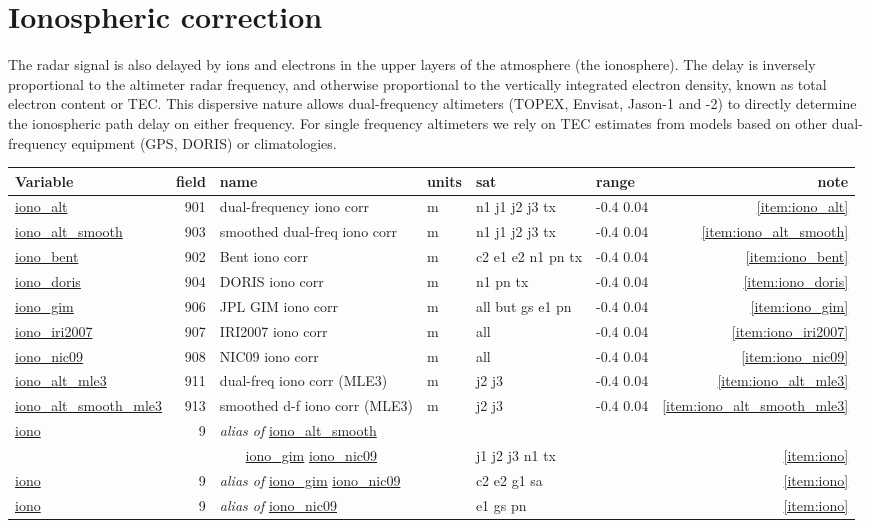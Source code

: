 \documentclass[a4paper,11pt,openany,natbib,nomargin]{thesis}
\makeatletter
\newcommand\var[1]{\url{#1}\index{variables!#1@\protect\url{#1}}}
\newcommand\alias[1]{\emph{alias of} \var{#1}}
\newenvironment{vartable}{
\begin{table}[ht]
\small
\begin{tabular}{lrllllr}
\hline
Variable & field & name & units & sat & range & note \\
\hline
}{
\hline
\end{tabular}
\end{table}
}
\makeatother
\begin{document}
\section{Ionospheric correction}
The radar signal is also delayed by ions and electrons in the upper layers of the atmosphere (the ionosphere). The delay is inversely proportional to the altimeter radar frequency, and otherwise proportional to the vertically integrated electron density, known as total electron content or TEC. This dispersive nature allows dual-frequency altimeters (TOPEX, Envisat, Jason-1 and -2) to directly determine the ionospheric path delay on either frequency. For single frequency altimeters we rely on TEC estimates from models based on other dual-frequency equipment (GPS, DORIS) or climatologies.

\begin{vartable}
\var{iono_alt} & 901 & dual-frequency iono corr & m & n1 j1 j2 j3 tx & -0.4 0.04 & \ref{item:iono_alt} \\
\var{iono_alt_smooth} & 903 & smoothed dual-freq iono corr & m & n1 j1 j2 j3 tx & -0.4 0.04 & \ref{item:iono_alt_smooth} \\
\var{iono_bent} & 902 & Bent iono corr & m & c2 e1 e2 n1 pn tx & -0.4 0.04 & \ref{item:iono_bent} \\
\var{iono_doris} & 904 & DORIS iono corr & m & n1 pn tx & -0.4 0.04 & \ref{item:iono_doris} \\
\var{iono_gim} & 906 & JPL GIM iono corr & m & all but gs e1 pn & -0.4 0.04 & \ref{item:iono_gim} \\
\var{iono_iri2007} & 907 & IRI2007 iono corr & m & all & -0.4 0.04 & \ref{item:iono_iri2007} \\
\var{iono_nic09} & 908 & NIC09 iono corr & m & all & -0.4 0.04 & \ref{item:iono_nic09} \\
\var{iono_alt_mle3} & 911 & dual-freq iono corr (MLE3) & m & j2 j3 & -0.4 0.04 & \ref{item:iono_alt_mle3} \\
\var{iono_alt_smooth_mle3} & 913 & smoothed d-f iono corr (MLE3) & m & j2 j3 & -0.4 0.04 & \ref{item:iono_alt_smooth_mle3} \\
\hline
\var{iono} & 9 & \alias{iono_alt_smooth} & &  &&  \\
& & ~~~ \var{iono_gim} \var{iono_nic09} & & j1 j2 j3 n1 tx && \ref{item:iono} \\
\var{iono} & 9 & \alias{iono_gim} \var{iono_nic09} & & c2 e2 g1 sa && \ref{item:iono} \\
\var{iono} & 9 & \alias{iono_nic09} & & e1 gs pn && \ref{item:iono} \\
\end{vartable}
\end{document}
